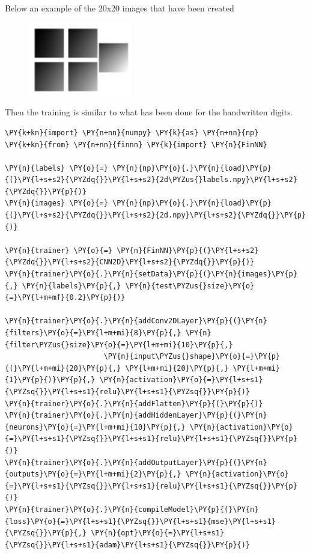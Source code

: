Below an example of the 20x20 images that have been created
\begin{figure}[htb]
\centering
\includegraphics[width=0.4\textwidth]{figures/2d_training_images}
\end{figure}

Then the training is similar to what has been done for the handwritten
digits.

\begin{tcolorbox}[breakable, size=fbox, boxrule=1pt, pad at break*=1mm,colback=cellbackground, colframe=cellborder]
\begin{Verbatim}[commandchars=\\\{\}]
\PY{k+kn}{import} \PY{n+nn}{numpy} \PY{k}{as} \PY{n+nn}{np}
\PY{k+kn}{from} \PY{n+nn}{finnn} \PY{k}{import} \PY{n}{FinNN}
	
\PY{n}{labels} \PY{o}{=} \PY{n}{np}\PY{o}{.}\PY{n}{load}\PY{p}{(}\PY{l+s+s2}{\PYZdq{}}\PY{l+s+s2}{2d\PYZus{}labels.npy}\PY{l+s+s2}{\PYZdq{}}\PY{p}{)}
\PY{n}{images} \PY{o}{=} \PY{n}{np}\PY{o}{.}\PY{n}{load}\PY{p}{(}\PY{l+s+s2}{\PYZdq{}}\PY{l+s+s2}{2d.npy}\PY{l+s+s2}{\PYZdq{}}\PY{p}{)}
	
\PY{n}{trainer} \PY{o}{=} \PY{n}{FinNN}\PY{p}{(}\PY{l+s+s2}{\PYZdq{}}\PY{l+s+s2}{CNN2D}\PY{l+s+s2}{\PYZdq{}}\PY{p}{)}
\PY{n}{trainer}\PY{o}{.}\PY{n}{setData}\PY{p}{(}\PY{n}{images}\PY{p}{,} \PY{n}{labels}\PY{p}{,} \PY{n}{test\PYZus{}size}\PY{o}{=}\PY{l+m+mf}{0.2}\PY{p}{)}
	
\PY{n}{trainer}\PY{o}{.}\PY{n}{addConv2DLayer}\PY{p}{(}\PY{n}{filters}\PY{o}{=}\PY{l+m+mi}{8}\PY{p}{,} \PY{n}{filter\PYZus{}size}\PY{o}{=}\PY{l+m+mi}{10}\PY{p}{,} 
                       \PY{n}{input\PYZus{}shape}\PY{o}{=}\PY{p}{(}\PY{l+m+mi}{20}\PY{p}{,} \PY{l+m+mi}{20}\PY{p}{,} \PY{l+m+mi}{1}\PY{p}{)}\PY{p}{,} \PY{n}{activation}\PY{o}{=}\PY{l+s+s1}{\PYZsq{}}\PY{l+s+s1}{relu}\PY{l+s+s1}{\PYZsq{}}\PY{p}{)}
\PY{n}{trainer}\PY{o}{.}\PY{n}{addFlatten}\PY{p}{(}\PY{p}{)}
\PY{n}{trainer}\PY{o}{.}\PY{n}{addHiddenLayer}\PY{p}{(}\PY{n}{neurons}\PY{o}{=}\PY{l+m+mi}{10}\PY{p}{,} \PY{n}{activation}\PY{o}{=}\PY{l+s+s1}{\PYZsq{}}\PY{l+s+s1}{relu}\PY{l+s+s1}{\PYZsq{}}\PY{p}{)}
\PY{n}{trainer}\PY{o}{.}\PY{n}{addOutputLayer}\PY{p}{(}\PY{n}{outputs}\PY{o}{=}\PY{l+m+mi}{2}\PY{p}{,} \PY{n}{activation}\PY{o}{=}\PY{l+s+s1}{\PYZsq{}}\PY{l+s+s1}{relu}\PY{l+s+s1}{\PYZsq{}}\PY{p}{)}
\PY{n}{trainer}\PY{o}{.}\PY{n}{compileModel}\PY{p}{(}\PY{n}{loss}\PY{o}{=}\PY{l+s+s1}{\PYZsq{}}\PY{l+s+s1}{mse}\PY{l+s+s1}{\PYZsq{}}\PY{p}{,} \PY{n}{opt}\PY{o}{=}\PY{l+s+s1}{\PYZsq{}}\PY{l+s+s1}{adam}\PY{l+s+s1}{\PYZsq{}}\PY{p}{)}
	

\end{Verbatim}
\end{tcolorbox}
